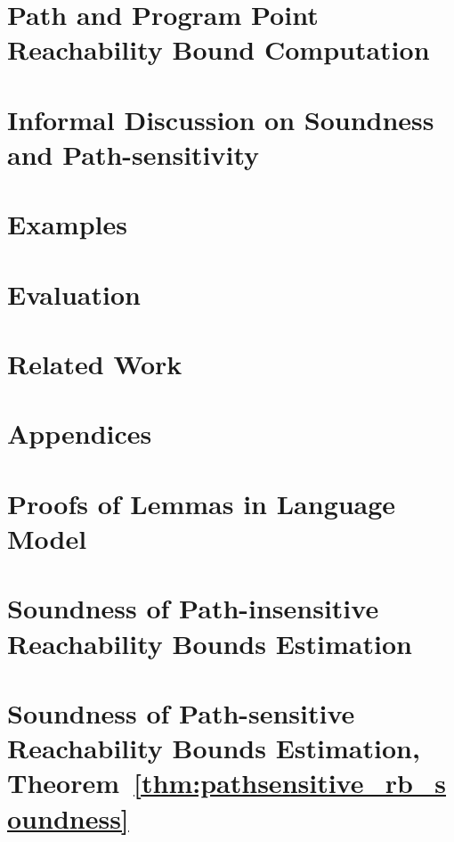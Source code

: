 \documentclass[a4paper,11pt]{article}
\begin{document}
\section{Path and Program Point Reachability Bound Computation}
\label{sec:alg-rb}



\section{Informal Discussion on Soundness and Path-sensitivity}
\label{sec:thminformal}


\section{Examples}
\label{sec:example}





\section{Evaluation}
\section{Related Work}
%
\clearpage
\appendix
{}
\section*{Appendices}
\section{Proofs of Lemmas in Language Model}
\label{apdx:lem_language}

\clearpage
\section{Soundness of Path-insensitive Reachability Bounds Estimation}
\label{apdx:pathinsensitive_rb_soundness}

\clearpage
\section{Soundness of Path-sensitive Reachability Bounds Estimation, Theorem~\ref{thm:pathsensitive_rb_soundness}}
\label{apdx:pathsensitive_rb_soundness}


\clearpage


\end{document}
